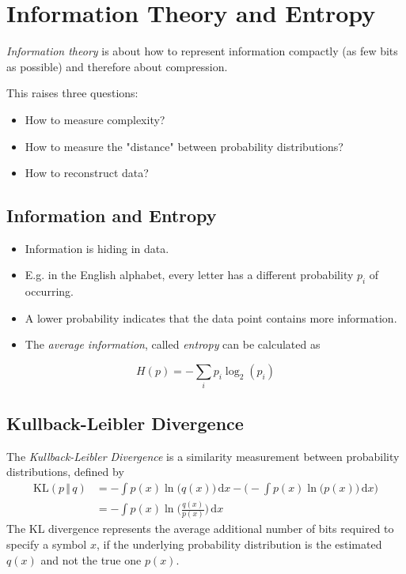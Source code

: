 \documentclass[a4paper, 11pt, accentcolor = tud3b]{tudreport}
\newcommand{\dif}[1]{\ensuremath{\,\mathrm{d}#1}}
\begin{document}
		\section{Information Theory and Entropy}
			\emph{Information theory} is about how to represent information compactly (as few bits as possible) and therefore about compression.

			This raises three questions:
			\begin{itemize}
				\item How to measure complexity?
				\item How to measure the "distance" between probability distributions?
				\item How to reconstruct data?
			\end{itemize}

			\subsection{Information and Entropy}
				\begin{itemize}
					\item Information is hiding in data.
					\item E.g. in the English alphabet, every letter has a different probability \(p_i\) of occurring.
					\item A lower probability indicates that the data point contains more information.
					\item The \emph{average information}, called \emph{entropy} can be calculated as
				\end{itemize}
				\begin{equation}
					H(p) = -\sum_{i} p_i \log_2(p_i)
				\end{equation}

			\subsection{Kullback-Leibler Divergence}
				The \emph{Kullback-Leibler Divergence} is a similarity measurement between probability distributions, defined by
				\begin{align}
					\textrm{KL}(p \,\Vert\, q) &= -\int p(x) \ln\big(q(x)\big) \dif{x} - \Bigg( -\int p(x) \ln\big(p(x)\big) \dif{x} \Bigg) \\
						&= -\int p(x) \ln\bigg(\frac{q(x)}{p(x)}\bigg) \dif{x}
				\end{align}
				The KL divergence represents the average additional number of bits required to specify a symbol \(x\), if the underlying probability distribution is the estimated \(q(x)\) and not the true one \(p(x)\).
\end{document}
